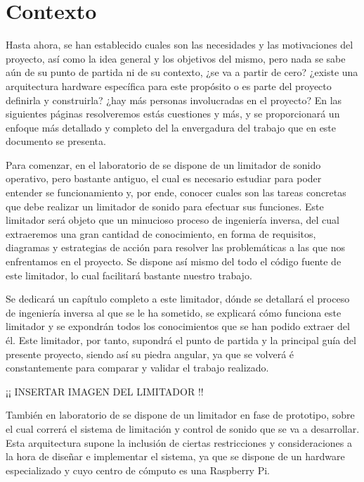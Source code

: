 \section{Contexto} \label{sec:contexto}

Hasta ahora, se han establecido cuales son las necesidades y las motivaciones del proyecto, así como la idea general y los objetivos del mismo, pero nada se sabe aún de su punto de partida ni de su contexto, ¿se va a partir de cero? ¿existe una arquitectura hardware específica para este propósito o es parte del proyecto definirla y construirla? ¿hay más personas involucradas en el proyecto? En las siguientes páginas resolveremos estás cuestiones y más, y se proporcionará un enfoque más detallado y completo del la envergadura del trabajo que en este documento se presenta.


Para comenzar, en el laboratorio de  se dispone de un limitador de sonido operativo, pero bastante antiguo, el cual es necesario estudiar para poder entender se funcionamiento y, por ende, conocer cuales son las tareas concretas que debe realizar un limitador de sonido para efectuar sus funciones. Este limitador será objeto que un minucioso proceso de ingeniería inversa, del cual extraeremos una gran cantidad de conocimiento, en forma de requisitos, diagramas y estrategias de acción para resolver las problemáticas a las que nos enfrentamos en el proyecto. Se dispone así mismo del todo el código fuente de este limitador, lo cual facilitará bastante nuestro trabajo.

Se dedicará un capítulo completo a este limitador, dónde se detallará el proceso de ingeniería inversa al que se le ha sometido, se explicará cómo funciona este limitador y se expondrán todos los conocimientos que se han podido extraer del él. Este limitador, por tanto, supondrá el punto de partida y la principal guía del presente proyecto, siendo así su piedra angular, ya que se volverá é constantemente para comparar y validar el trabajo realizado.


¡¡ INSERTAR IMAGEN DEL LIMITADOR !!


También en laboratorio de  se dispone de un limitador en fase de prototipo, sobre el cual correrá el sistema de limitación y control de sonido que se va a desarrollar. Esta arquitectura supone la inclusión de ciertas restricciones y consideraciones a la hora de diseñar e implementar el sistema, ya que se dispone de un hardware especializado y cuyo centro de cómputo es una Raspberry Pi.


